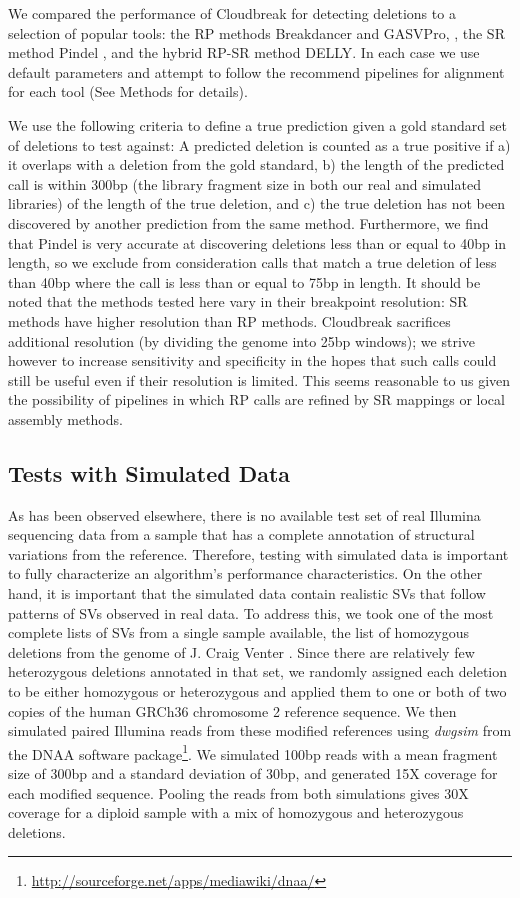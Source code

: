 \documentclass[11pt]{article}
\begin{document}
We compared the performance of Cloudbreak for detecting deletions to a selection of popular tools: the RP methods Breakdancer \autocite{Chen:2009p3} and GASVPro, \autocite{Sindi:2012kk}, the SR method Pindel \autocite{Ye:2009p2}, and the hybrid RP-SR method DELLY. \autocite{Rausch:2012he} In each case we use default parameters and attempt to follow the recommend pipelines for alignment for each tool (See Methods for details).

We use the following criteria to define a true prediction given a gold standard set of deletions to test against: A predicted deletion is counted as a true positive if a) it overlaps with a deletion from the gold standard, b) the length of the predicted call is within 300bp (the library fragment size in both our real and simulated libraries) of the length of the true deletion, and c) the true deletion has not been discovered by another prediction from the same method. Furthermore, we find that Pindel is very accurate at discovering deletions less than or equal to 40bp in length, so we exclude from consideration calls that match a true deletion of less than 40bp where the call is less than or equal to 75bp in length. It should be noted that the methods tested here vary in their breakpoint resolution: SR methods have higher resolution than RP methods. Cloudbreak sacrifices additional resolution (by dividing the genome into 25bp windows); we strive however to increase sensitivity and specificity in the hopes that such calls could still be useful even if their resolution is limited. This seems reasonable to us given the possibility of pipelines in which RP calls are refined by SR mappings or local assembly methods.

\subsection{Tests with Simulated Data}

As has been observed elsewhere, there is no available test set of real Illumina sequencing data from a sample that has a complete annotation of structural variations from the reference. Therefore, testing with simulated data is important to fully characterize an algorithm's performance characteristics. On the other hand, it is important that the simulated data contain realistic SVs that follow patterns of SVs observed in real data. To address this, we took one of the most complete lists of SVs from a single sample available, the list of homozygous deletions from the genome of J. Craig Venter \autocite{Levy:2007fb}. Since there are relatively few heterozygous deletions annotated in that set, we randomly assigned each deletion to be either homozygous or heterozygous and applied them to one or both of two copies of the human GRCh36 chromosome 2 reference sequence. We then simulated paired Illumina reads from these modified references using \emph{dwgsim} from the DNAA software package\footnote{\url{http://sourceforge.net/apps/mediawiki/dnaa/}}. We simulated 100bp reads with a mean fragment size of 300bp and a standard deviation of 30bp, and generated 15X coverage for each modified sequence. Pooling the reads from both simulations gives 30X coverage for a diploid sample with a mix of homozygous and heterozygous deletions.
\end{document}
